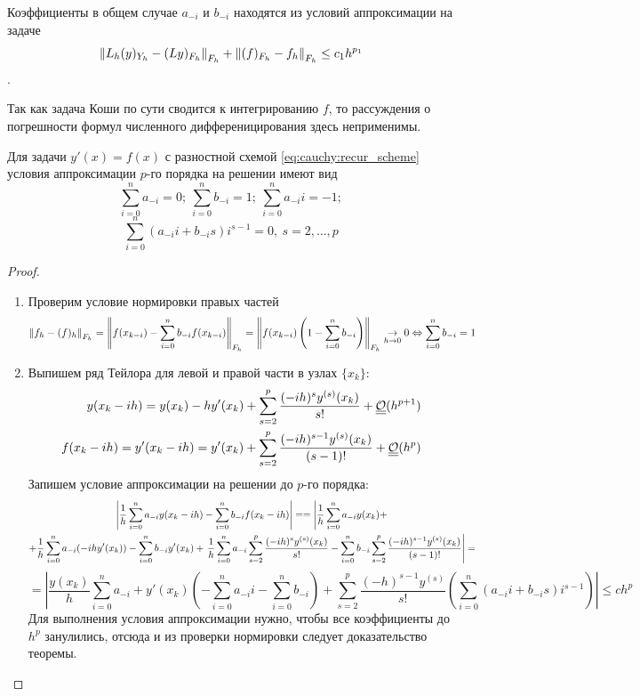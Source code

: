 Коэффициенты в общем случае $a_{-i}$ и $b_{-i}$ находятся из условий
аппроксимации на задаче
\[\left\lVert L_h(y)_{Y_h} - (Ly)_{F_h}\right\rVert_{F_h}+\left\lVert(f)_{F_h}-f_h\right\rVert_{F_h}\leq c_1h^{p_1}\].

\begin{remark}
  Так как задача Коши по сути сводится к интегрированию $f$, то
  рассуждения о погрешности формул численного дифференицирования здесь неприменимы.
\end{remark}

\begin{theorem}
  Для задачи $y'(x)=f(x)$ с разностной схемой \eqref{eq:cauchy:recur_scheme}
  условия аппроксимации $p$-го порядка на решении имеют вид
  \[\sum_{i=0}^na_{-i}=0;\ \sum_{i=0}^nb_{-i}=1;\ \sum_{i=0}^na_{-i}i=-1;\]
  \[\sum_{i=0}^n(a_{-i}i+b_{-i}s)i^{s-1}=0,\ s=2,\ldots,p\]
\end{theorem}
\begin{proof}
  \begin{enumerate}
    \item Проверим условие нормировки правых частей
          \[\left\lVert f_h-(f)_h\right\rVert_{F_h}=\left\lVert f(x_{k-i})-\sum_{i=0}^nb_{-i}f(x_{k-i})\right\rVert_{F_h}=\left\lVert f(x_{k-i})\left(1-\sum_{i=0}^nb_{-i}\right)\right\rVert_{F_h}\underset{h\rightarrow0}{\rightarrow}0\Leftrightarrow\sum_{i=0}^nb_{-i}=1\]
    \item Выпишем ряд Тейлора для левой и правой части в узлах $\{x_k\}$:
          \begin{align*}
            y(x_k-ih)=y(x_k)-hy'(x_k)+\sum_{s=2}^{p}\frac{(-ih)^{s}y^{(s)}(x_k)}{s!} + \underline{\underline{\mathcal{O}}}(h^{p+1})        \\
            f(x_k-ih)=y'(x_k-ih)=y'(x_k)+\sum_{s=2}^{p}\frac{(-ih)^{s-1}y^{(s)}(x_k)}{(s-1)!} + \underline{\underline{\mathcal{O}}}(h^{p}) \\
          \end{align*}
          Запишем условие аппроксимации на решении до $p$-го порядка:
          \begin{multline*}
            \left\lvert\frac{1}{h}\sum_{i=0}^na_{-i}y(x_k-ih)-\sum_{i=0}^nb_{-i}f(x_k-ih)\right\rvert =
            = \left|\frac{1}{h}\sum_{i=0}^na_{-i}y(x_k)+\right. \\
            +\frac{1}{h}\sum_{i=0}^na_{-i}(-ihy'(x_k))-\sum_{i=0}^nb_{-i}y'(x_k)+\left.\frac{1}{h}\sum_{i=0}^na_{-i}\sum_{s=2}^{p}\frac{(-ih)^sy^{(s)}(x_k)}{s!}-\sum_{i=0}^nb_{-i}\sum_{s=2}^{p}\frac{(-ih)^{s-1}y^{(s)}(x_k)}{(s-1)!}\right|=
          \end{multline*}
          \[
            =\left|\frac{y(x_k)}{h}\sum_{i=0}^na_{-i}+y'(x_k)\left(-\sum_{i=0}^na_{-i}i-\sum_{i=0}^nb_{-i}\right)
            +\sum_{s=2}^{p}\frac{(-h)^{s-1}y^{(s)}}{s!}\left(\sum_{i=0}^n(a_{-i}i+b_{-i}s)i^{s-1}\right)\right|\leq ch^p
          \]
          Для выполнения условия аппроксимации нужно, чтобы все коэффициенты до $h^p$ занулились, отсюда
          и из проверки нормировки следует доказательство теоремы.
  \end{enumerate}
\end{proof}
